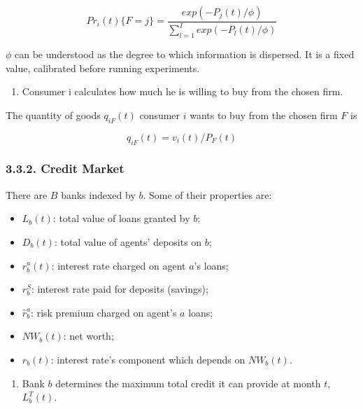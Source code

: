 \documentclass[11pt,]{article}
\providecommand{\tightlist}{%
\setlength{\itemsep}{0pt}\setlength{\parskip}{0pt}}
\begin{document}
\begin{equation}\label{trade4}
   Pr_i(t)\{F = j\} =  \frac{ exp(-P_j(t)/\phi)}{ \sum_{l = 1}^{I} exp(-P_l(t)/\phi) } 
\end{equation}

\(\phi\) can be understood as the degree to which information is
dispersed. It is a fixed value, calibrated before running experiments.

\begin{enumerate}
\def\labelenumi{\alph{enumi}.}
\setcounter{enumi}{1}
\tightlist
\item
  Consumer i calculates how much he is willing to buy from the chosen
  firm.
\end{enumerate}

The quantity of goods \(q_{iF}(t)\) consumer \(i\) wants to buy from the
chosen firm \(F\) is

\begin{equation}
  q_{iF}(t) = v_i(t)/P_F(t)
\end{equation}

\subsubsection{3.3.2. Credit Market}\label{credit-market}

There are \(B\) banks indexed by \(b\). Some of their properties are:

\begin{itemize}
\tightlist
\item
  \(L_b(t)\): total value of loans granted by \(b\);
\item
  \(D_b(t)\): total value of agents' deposits on \(b\);
\item
  \(r^a_b(t)\): interest rate charged on agent \(a\)'s loans;
\item
  \(r^S_b\): interest rate paid for deposits (savings);
\item
  \(\hat{r}_b^a\): risk premium charged on agent's \(a\) loans;
\item
  \(NW_b(t)\): net worth;
\item
  \(r_b(t)\): interest rate's component which depends on \(NW_b(t)\).
\end{itemize}

\begin{enumerate}
\def\labelenumi{\alph{enumi}.}
\tightlist
\item
  Bank \(b\) determines the maximum total credit it can provide at month
  \(t\), \(L_b^T(t)\).
\end{enumerate}
\end{document}
